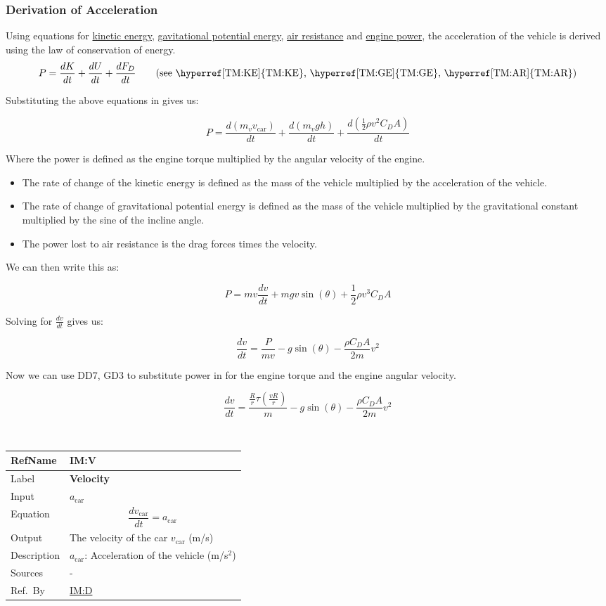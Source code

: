 \documentclass[12pt]{article}
\newcommand{\colAwidth}{0.13\textwidth}
\newcommand{\colBwidth}{0.82\textwidth}
\newcommand{\hpref}[1]{\hyperref[#1]{#1}}
\newcommand{\definstance}[8] {
~\newline
\noindent
\begin{minipage}{\textwidth}
\renewcommand*{\arraystretch}{1.5}
\begin{tabular}{| p{\colAwidth} | p{\colBwidth}|}
  \hline
  \rowcolor[gray]{0.9}
  RefName& \textbf{#1} \label{#1}\\
  \hline
  Label& \bf #2 \\
  \hline
  Input& #3\\
  \hline
  Equation& #4\\
  \hline
  Output& #5\\
  \hline
  Description& #6 \\
  \hline
  Sources& #7 \\
  \hline
  Ref.\ By & #8\\
  \hline
\end{tabular}
\end{minipage}\\
}
\begin{document}
  
\subsubsection*{Derivation of Acceleration}

Using equations for \hyperref[TM:KE]{kinetic energy}, \hyperref[TM:GE]{gavitational potential energy}, \hyperref[TM:AR]{air resistance} and \hyperref[TM:ET]{engine power}, the acceleration of the vehicle is derived using the law of conservation of energy.
\[
P = \frac{dK}{dt} + \frac{dU}{dt} + \frac{dF_D}{dt} \tag*{\text{(see \hpref{TM:KE}, \hpref{TM:GE}, \hpref{TM:AR})}}
\]

Substituting the above equations in gives us:

\[
P = \frac{d(m_v v_\text{car})}{dt} + \frac{d(m_v g h)}{dt} + \frac{d(\frac{1}{2} \rho v^2 C_D A)}{dt} 
\]
  
Where the power is defined as the engine torque multiplied by the angular velocity of the engine. 
\begin{itemize}
\item The rate of change of the kinetic energy is defined as the mass of the vehicle multiplied by the acceleration of the vehicle.
\item The rate of change of gravitational potential energy is defined as the mass of the vehicle multiplied by the gravitational constant multiplied by the sine of the incline angle.
\item The power lost to air resistance is the drag forces times the velocity.
\end{itemize}

We can then write this as:

\[
P = mv\frac{dv}{dt} + mgv\sin(\theta) + \frac{1}{2} \rho v^3 C_D A
\]

Solving for $\frac{dv}{dt}$ gives us:

\[
\frac{dv}{dt} = \frac{P}{mv} - g\sin(\theta) - \frac{\rho C_D A}{2m} v^2 
\]

Now we can use DD7, GD3 to substitute power in for the engine torque and the engine angular velocity.

\[
\frac{dv}{dt} = \frac{\frac{R}{r} \tau(\frac{v R}{r})}{m} - g\sin(\theta) - \frac{\rho C_D A}{2m} v^2
\]



\definstance
{IM:V}
{Velocity}
{$a_\text{car}$}
{\[
\frac{dv_\text{car}}{dt} = a_\text{car}
\]}
{The velocity of the car $v_\text{car}$ (m/s)}
{$a_\text{car}$: Acceleration of the vehicle (m/s$^2$)}
{-}
{\hpref{IM:D}}
\end{document}
